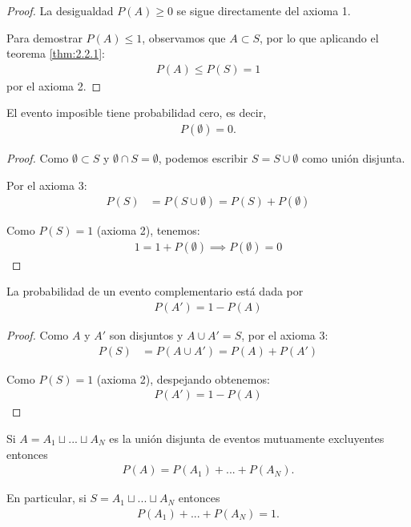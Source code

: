 \begin{proof}
	La desigualdad $P(A) \geq 0$ se sigue directamente del axioma 1.
	
	Para demostrar $P(A) \leq 1$, observamos que $A \subset S$, por lo que aplicando el teorema \ref{thm:2.2.1}:
	\begin{align}
		P(A) \leq P(S) = 1
	\end{align}
	por el axioma 2.
\end{proof}


\begin{teorema}
	\label{thm:2.2.3}
	El evento imposible tiene probabilidad cero, es decir,
	\begin{align}
		P(\emptyset)=0.
	\end{align}
\end{teorema}

\begin{proof}
	Como $\emptyset \subset S$ y $\emptyset \cap S = \emptyset$, podemos escribir $S = S \cup \emptyset$ como unión disjunta.
	
	Por el axioma 3:
	\begin{align}
		P(S) &= P(S \cup \emptyset) = P(S) + P(\emptyset)
	\end{align}
	
	Como $P(S) = 1$ (axioma 2), tenemos:
	\begin{align}
		1 = 1 + P(\emptyset) \implies P(\emptyset) = 0
	\end{align}
\end{proof}


\begin{teorema}
	\label{thm:2.2.4} La probabilidad de un evento complementario está dada por
	\begin{align}
		\label{eq:2.2.6}
		P(A')=1-P(A)
	\end{align}
\end{teorema}

\begin{proof}
	Como $A$ y $A'$ son disjuntos y $A \cup A' = S$, por el axioma 3:
	\begin{align}
		P(S) &= P(A \cup A') = P(A) + P(A')
	\end{align}
	
	Como $P(S) = 1$ (axioma 2), despejando obtenemos:
	\begin{align}
		P(A') = 1 - P(A)
	\end{align}
\end{proof}

\begin{teorema}
	\label{thm:2.2.5} Si $A=A_{1}\sqcup...\sqcup A_{N}$ es la unión disjunta de eventos mutuamente excluyentes entonces
	\begin{align}
		\label{eq:2.2.7}
		P(A)=P(A_{1})+...+P(A_{N}).
	\end{align}


	En particular, si $S=A_{1}\sqcup...\sqcup A_{N}$ entonces
	\begin{align}
		\label{eq:2.2.8}
		P(A_{1})+...+P(A_{N})=1.
	\end{align}
\end{teorema}



